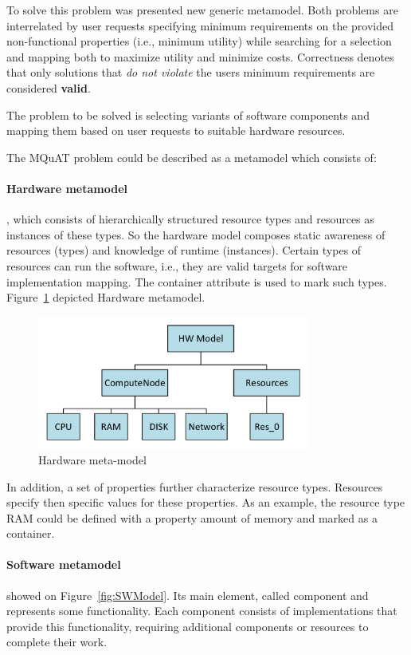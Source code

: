 To solve this problem was presented new generic metamodel. Both problems are interrelated by user requests specifying minimum requirements on the provided non-functional properties (i.e., minimum utility) while searching for a selection and mapping both to maximize utility and minimize costs. Correctness denotes that only solutions that \textit{do not violate} the users minimum requirements are considered \textbf{valid}.

The problem to be solved is selecting variants of software components and mapping them based on user requests to suitable hardware resources.

The MQuAT problem could be described as a metamodel which consists of:
\paragraph{Hardware metamodel}, which consists of hierarchically structured resource types and resources as instances of these types. So the hardware model composes static awareness of resources (types) and knowledge of runtime (instances). Certain types of resources can run the software, i.e., they are valid targets for software implementation mapping. The container attribute is used to mark such types. Figure~\ref{fig:HWmodel} depicted Hardware metamodel.

\begin{figure}
	\centering
	\includegraphics[width=0.8\textwidth]{images/HWModel}
	\caption[Hardware meta-model]{Hardware meta-model}
	\label{fig:HWmodel}
\end{figure}


In addition, a set of properties further characterize resource types. Resources specify then specific values for these properties. As an example, the resource type RAM could be defined with a property amount of memory and marked as a container.

\paragraph{Software metamodel} showed on Figure~\ref{fig:SWModel}. Its main element, called component and represents some functionality.
Each component consists of implementations that provide this functionality, requiring additional components or resources to complete their work. 

